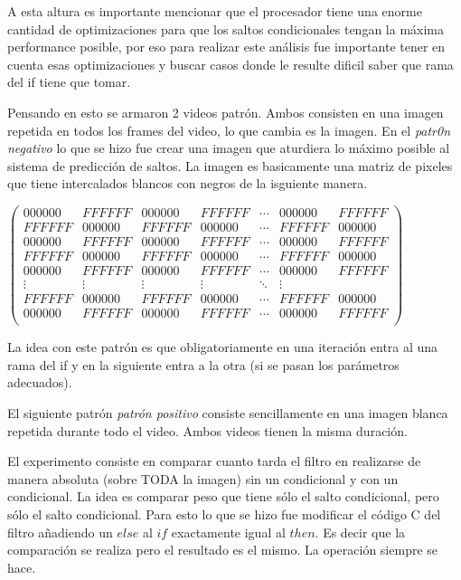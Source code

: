 	A esta altura es importante mencionar que el procesador tiene una enorme
cantidad de optimizaciones para que los saltos condicionales
tengan la máxima performance posible, por eso para realizar este
análisis fue importante tener en cuenta esas optimizaciones y buscar
casos donde le resulte dificil saber que rama del if tiene que tomar.

	Pensando en esto se armaron 2 videos patrón. Ambos consisten
en una imagen repetida en todos los frames del video, lo que
cambia es la imagen.
	En el \textit{patr0n negativo} lo que se hizo fue crear una imagen
que aturdiera lo máximo posible al sistema de predicción de saltos.
La imagen es basicamente una matriz de pixeles que tiene
intercalados blancos con negros de la isguiente manera.

\begin{center}
$
 \begin{pmatrix}
   000000 & FFFFFF & 000000 & FFFFFF & \cdots & 000000 & FFFFFF \\
   FFFFFF & 000000 & FFFFFF & 000000 & \cdots & FFFFFF & 000000 \\
   000000 & FFFFFF & 000000 & FFFFFF & \cdots & 000000 & FFFFFF \\
   FFFFFF & 000000 & FFFFFF & 000000 & \cdots & FFFFFF & 000000 \\
   000000 & FFFFFF & 000000 & FFFFFF & \cdots & 000000 & FFFFFF \\
   \vdots & \vdots & \vdots  & \vdots  & \ddots & \vdots  \\
   FFFFFF & 000000 & FFFFFF & 000000 & \cdots & FFFFFF & 000000 \\
   000000 & FFFFFF & 000000 & FFFFFF & \cdots & 000000 & FFFFFF \\
\end{pmatrix}
$
\end{center}

	La idea con este patrón es que obligatoriamente en una iteración
entra al una rama del if y en la siguiente entra a la otra (si se pasan
los parámetros adecuados).

	El siguiente patrón \textit{patrón positivo} consiste sencillamente en una
imagen blanca repetida durante todo el video. Ambos videos tienen
la misma duración.

	El experimento consiste en comparar cuanto tarda el filtro
en realizarse de manera absoluta (sobre TODA la imagen) sin un
condicional y con un condicional. La idea es comparar peso que 
tiene sólo el salto condicional, pero sólo el salto condicional. Para esto
lo que se hizo fue modificar el código C del filtro añadiendo un 
$else$ al $if$ exactamente igual al $then$. Es decir que la comparación
se realiza pero el resultado es el mismo. La operación siempre se hace.

